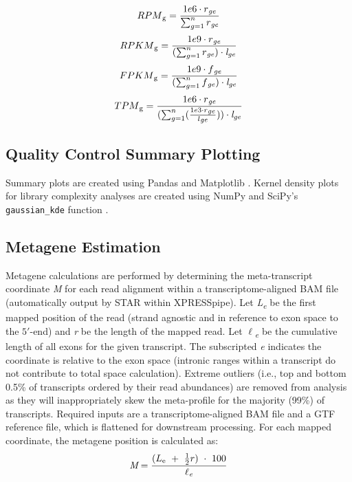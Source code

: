 \documentclass[10pt, oneside]{article}
\begin{document}
\begin{multicols}{2}
  \begin{equation}
    RPM\textsubscript{g} = \frac{1e6 \cdot r\textsubscript{\textit{ge}}}{\sum_{g=1}^{n} r\textsubscript{\textit{ge}}}
  \end{equation}
  \begin{equation}
    RPKM\textsubscript{g} = \frac{1e9 \cdot r\textsubscript{\textit{ge}}}{(\sum_{g=1}^{n} r\textsubscript{\textit{ge}}) \cdot \textit{l} \textsubscript{\textit{ge}}}
  \end{equation}
  \begin{equation}
    FPKM\textsubscript{g} = \frac{1e9 \cdot f\textsubscript{\textit{ge}}}{(\sum_{g=1}^{n} f\textsubscript{\textit{ge}}) \cdot \textit{l} \textsubscript{\textit{ge}}}
  \end{equation}
  \begin{equation}
    TPM\textsubscript{g} = \frac{1e6 \cdot r\textsubscript{\textit{ge}}}{(\sum_{g=1}^{n} (\frac{1e3 \cdot r\textsubscript{\textit{ge}}}{l\textsubscript{\textit{ge}}})) \cdot \textit{l} \textsubscript{\textit{ge}}}
  \end{equation}


\subsection*{Quality Control Summary Plotting}
Summary plots are created using Pandas \cite{pandas} and Matplotlib \cite{matplotlib}. Kernel density plots for library complexity analyses are created using NumPy \cite{numpy1, numpy2} and SciPy's \texttt{gaussian\_kde} function \cite{scipy}.

\subsection*{Metagene Estimation}
Metagene calculations are performed by determining the meta-transcript coordinate \textit{M} for each read alignment within a transcriptome-aligned BAM file (automatically output by STAR within XPRESSpipe). Let \textit{L\textsubscript{e}} be the first mapped position of the read (strand agnostic and in reference to exon space to the $5'$-end) and \textit{r} be the length of the mapped read. Let \textit{$\ell$\textsubscript{e}} be the cumulative length of all exons for the given transcript. The subscripted \textit{e} indicates the coordinate is relative to the exon space (intronic ranges within a transcript do not contribute to total space calculation). Extreme outliers (i.e., top and bottom 0.5\% of transcripts ordered by their read abundances) are removed from analysis as they will inappropriately skew the meta-profile for the majority (99\%) of transcripts. Required inputs are a transcriptome-aligned BAM file and a GTF reference file, which is flattened for downstream processing. For each mapped coordinate, the metagene position is calculated as:
\begin{equation}
\textit{M} = \frac{(L\textsubscript{e}\ +\ \frac{1}{2}r)\ \cdot\ 100}{\textit{$\ell$\textsubscript{e}}}
\end{equation}


\end{multicols}
\end{document}
